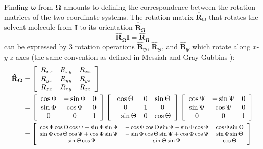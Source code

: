 Finding $\boldsymbol{\omega}$ from $\mathbf{\Omega}$ amounts to
defining the correspondence between the rotation matrices of the two
coordinate systems. The rotation matrix $\mathbf{\hat{R}}_{\mathbf{\Omega}}$
that rotates the solvent molecule from $\mathbf{I}$ to its orientation
$\mathbf{\hat{R}}_{\mathbf{\Omega}}$
\begin{equation}
\mathbf{\hat{R}}_{\mathbf{\Omega}}\mathbf{I}=\mathbf{\hat{R}}_{\mathbf{\Omega}}
\end{equation}
can be expressed by 3 rotation operations $\mathbf{\hat{R}}_{\Phi}$,
$\mathbf{\hat{R}}_{\Theta}$, and $\mathbf{\hat{R}}_{\Psi}$ which
rotate along $x$-$y$-$z$ axes (the same convention as defined in
Messiah \citep{Messiah} and Gray-Gubbins \citep{Gray-Gubbins}):
\begin{align}
\mathbf{\hat{R}}_{\mathbf{\Omega}} & =\left[\begin{array}{ccc}
R_{xx} & R_{xy} & R_{xz}\\
R_{yx} & R_{yy} & R_{yz}\\
R_{zx} & R_{zy} & R_{zz}
\end{array}\right]\\
 & =\left[\begin{array}{ccc}
\cos\Phi & -\sin\Phi & 0\\
\sin\Phi & \cos\Phi & 0\\
0 & 0 & 1
\end{array}\right]\left[\begin{array}{ccc}
\cos\Theta & 0 & \sin\Theta\\
0 & 1 & 0\\
-\sin\Theta & 0 & \cos\Theta
\end{array}\right]\left[\begin{array}{ccc}
\cos\Psi & -\sin\Psi & 0\\
\sin\Psi & \cos\Psi & 0\\
0 & 0 & 1
\end{array}\right]\nonumber \\
 & =\footnotesize\left[\begin{array}{ccc}
\cos\Phi\cos\Theta\cos\Psi-\sin\Phi\sin\Psi & -\cos\Phi\cos\Theta\sin\Psi-\sin\Phi\cos\Psi & \cos\Phi\sin\Theta\\
\sin\Phi\cos\Theta\cos\Psi+\cos\Phi\sin\Psi & -\sin\Phi\cos\Theta\sin\Psi+\cos\Phi\cos\Psi & \sin\Phi\sin\Theta\\
-\sin\Theta\cos\Psi & \sin\Theta\sin\Psi & \cos\Theta
\end{array}\right]\nonumber 
\end{align}
